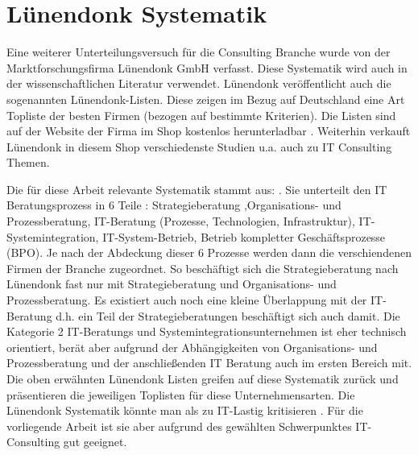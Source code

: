 \section{Lünendonk Systematik}
Eine weiterer Unterteilungsversuch für die Consulting Branche wurde von der Marktforschungsfirma Lünendonk GmbH verfasst.
Diese Systematik wird auch in der wissenschaftlichen Literatur \cite[56]{Lippold201309} verwendet. Lünendonk veröffentlicht
auch die sogenannten Lünendonk-Listen. Diese zeigen im Bezug auf Deutschland eine Art Topliste der besten Firmen (bezogen auf bestimmte Kriterien).
Die Listen sind auf der Website der Firma im Shop kostenlos herunterladbar \cite {topBITP} . Weiterhin verkauft Lünendonk in diesem Shop verschiedenste Studien u.a.
auch zu IT Consulting Themen.

Die für diese Arbeit relevante Systematik stammt aus: \cite[56]{Lippold201309}. Sie unterteilt den IT Beratungsprozess in 6 Teile :  Strategieberatung ,Organisations- und Prozessberatung, IT-Beratung (Prozesse, Technologien, Infrastruktur), IT-Systemintegration, IT-System-Betrieb, Betrieb kompletter Geschäftsprozesse (BPO). Je nach der Abdeckung dieser 6 Prozesse werden dann die verschiendenen Firmen der Branche zugeordnet. So beschäftigt sich die Strategieberatung nach Lünendonk fast nur mit Strategieberatung und Organisations- und Prozessberatung. Es existiert auch noch eine kleine Überlappung mit der IT-Beratung d.h. ein Teil der Strategieberatungen beschäftigt sich auch damit. Die Kategorie 2 IT-Beratungs und Systemintegrationsunternehmen ist eher technisch orientiert, berät aber aufgrund der Abhängigkeiten von Organisations- und Prozessberatung und der anschließenden IT Beratung auch im ersten Bereich mit. Die oben erwähnten Lünendonk Listen greifen auf diese Systematik zurück und präsentieren die jeweiligen \glqq Toplisten \grqq für diese Unternehmensarten. Die Lünendonk Systematik könnte man als zu IT-Lastig kritisieren \cite[56]{Lippold201309} . Für die vorliegende Arbeit ist sie aber aufgrund des gewählten Schwerpunktes
IT- Consulting gut geeignet.

